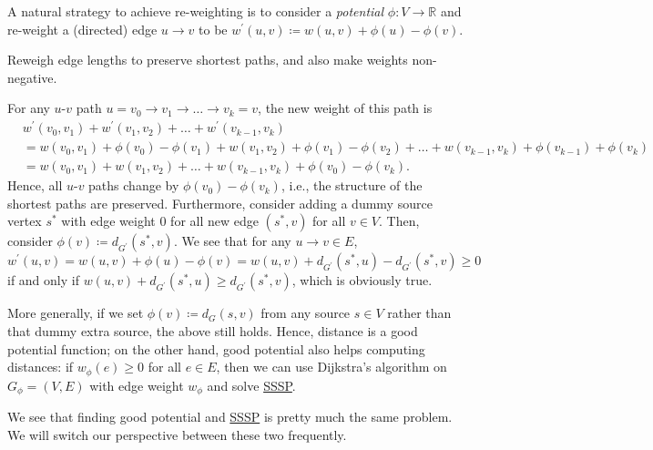 \begin{prev}\label{prev:Johnson-algorithm}
	A natural strategy to achieve re-weighting is to consider a \emph{potential} \(\phi \colon V \to \mathbb{R} \) and re-weight a (directed) edge \(u \to v\) to be \(w^{\prime} (u, v)\coloneqq w(u, v) + \phi (u) - \phi (v)\).
	\begin{intuition}
		Reweigh edge lengths to preserve shortest paths, and also make weights non-negative.
	\end{intuition}
	For any \(u\)-\(v\) path \(u = v_0 \to v_1 \to \dots \to v_k = v\), the new weight of this path is
	\[
		\begin{split}
			 & w^{\prime} (v_0, v_1 ) + w^{\prime} (v_1, v_2) + \dots + w^{\prime} (v_{k-1}, v_k)                                                      \\
			 & = w(v_0, v_1) + \phi (v_0) - \phi (v_1) + w(v_1, v_2) + \phi (v_1) - \phi (v_2) + \dots + w(v_{k-1}, v_k) + \phi (v_{k-1}) + \phi (v_k) \\
			 & = w(v_0, v_1) + w(v_1, v_2) + \dots + w(v_{k-1}, v_{k}) + \phi (v_0) - \phi (v_k).
		\end{split}
	\]
	Hence, all \(u\)-\(v\) paths change by \(\phi (v_0) - \phi (v_k)\), i.e., the structure of the shortest paths are preserved. Furthermore, consider adding a dummy source vertex \(s^{\ast} \) with edge weight \(0\) for all new edge \((s^{\ast} , v)\) for all \(v \in V\). Then, consider \(\phi (v) \coloneqq d_{G^{\prime} }(s^{\ast} , v)\). We see that for any \(u \to v \in E\),
	\[
		w^{\prime} (u, v) = w(u, v) + \phi (u) - \phi (v) = w(u, v) + d_{G^{\prime} }(s^{\ast} , u) - d_{G^{\prime} }(s^{\ast} , v) \geq 0
	\]
	if and only if \(w(u, v) + d_{G^{\prime} }(s^{\ast} , u) \geq d_{G^{\prime} }(s^{\ast} , v)\), which is obviously true.

	\begin{center}
	\end{center}
	More generally, if we set \(\phi (v) \coloneqq d_G(s, v)\) from any source \(s \in V\) rather than that dummy extra source, the above still holds. Hence, distance is a good potential function; on the other hand, good potential also helps computing distances: if \(w_{\phi } (e) \geq 0\) for all \(e \in E\), then we can use Dijkstra's algorithm on \(G_{\phi } = (V, E)\) with edge weight \(w_{\phi }\) and solve \hyperref[prb:SSSP]{SSSP}.
\end{prev}

We see that finding good potential and \hyperref[prb:SSSP]{SSSP} is pretty much the same problem. We will switch our perspective between these two frequently.